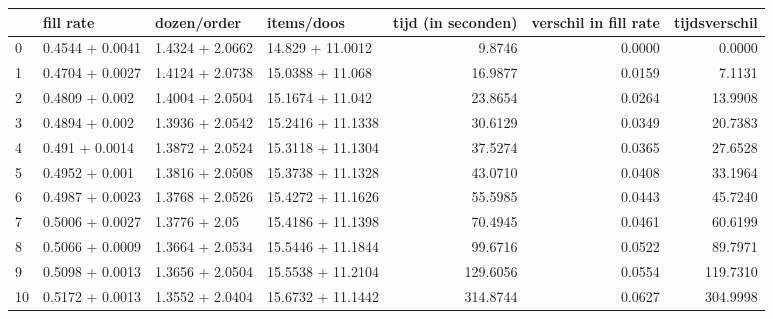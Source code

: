 \begin{tabular}{llllrrr}
\toprule
{} &        fill rate &      dozen/order &         items/doos &  tijd (in seconden) &  verschil in fill rate &  tijdsverschil \\
\midrule
0  &  0.4544 + 0.0041 &  1.4324 + 2.0662 &   14.829 + 11.0012 &              9.8746 &                 0.0000 &         0.0000 \\
1  &  0.4704 + 0.0027 &  1.4124 + 2.0738 &   15.0388 + 11.068 &             16.9877 &                 0.0159 &         7.1131 \\
2  &   0.4809 + 0.002 &  1.4004 + 2.0504 &   15.1674 + 11.042 &             23.8654 &                 0.0264 &        13.9908 \\
3  &   0.4894 + 0.002 &  1.3936 + 2.0542 &  15.2416 + 11.1338 &             30.6129 &                 0.0349 &        20.7383 \\
4  &   0.491 + 0.0014 &  1.3872 + 2.0524 &  15.3118 + 11.1304 &             37.5274 &                 0.0365 &        27.6528 \\
5  &   0.4952 + 0.001 &  1.3816 + 2.0508 &  15.3738 + 11.1328 &             43.0710 &                 0.0408 &        33.1964 \\
6  &  0.4987 + 0.0023 &  1.3768 + 2.0526 &  15.4272 + 11.1626 &             55.5985 &                 0.0443 &        45.7240 \\
7  &  0.5006 + 0.0027 &    1.3776 + 2.05 &  15.4186 + 11.1398 &             70.4945 &                 0.0461 &        60.6199 \\
8  &  0.5066 + 0.0009 &  1.3664 + 2.0534 &  15.5446 + 11.1844 &             99.6716 &                 0.0522 &        89.7971 \\
9  &  0.5098 + 0.0013 &  1.3656 + 2.0504 &  15.5538 + 11.2104 &            129.6056 &                 0.0554 &       119.7310 \\
10 &  0.5172 + 0.0013 &  1.3552 + 2.0404 &  15.6732 + 11.1442 &            314.8744 &                 0.0627 &       304.9998 \\
\bottomrule
\end{tabular}
